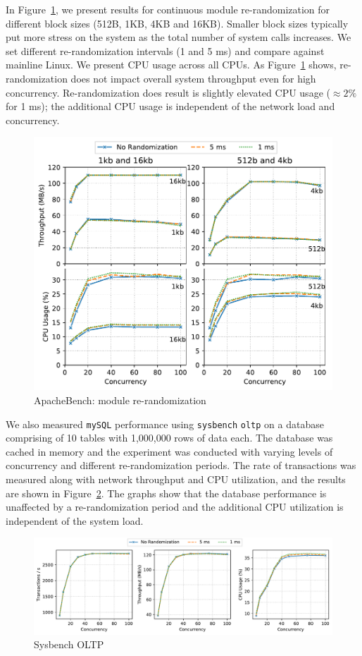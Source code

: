 In Figure~\ref{fig:network}, we present results for continuous module re-randomization for different block sizes (512B, 1KB, 4KB and 16KB). Smaller block sizes typically put more stress on the system as the total number of system calls increases. We set different re-randomization intervals (1 and 5 ms) and compare against mainline Linux. We present CPU usage across all CPUs.
As Figure~\ref{fig:network} shows, re-randomization does not impact overall system throughput even for high concurrency. Re-randomization does result is slightly elevated CPU usage ($\approx 2 \%$ for 1 ms); the additional CPU usage is independent of the network load and concurrency.

\begin{figure}[ht!]
\centering
\includegraphics[width=0.8\columnwidth]{charts/apache.pdf}
\caption{ApacheBench: module re-randomization}
\label{fig:network}
\end{figure}

We also measured \verb|mySQL| performance using \verb|sysbench| \verb|oltp| on a database comprising of 10 tables with 1,000,000 rows of data each. The database was cached in memory and the experiment was conducted with varying levels of concurrency and different re-randomization periods. The rate of transactions was measured along with network throughput and CPU utilization, and the results are shown in Figure~\ref{fig:sysbench_sql}. The graphs show that the database performance is unaffected by a re-randomization period and the additional CPU utilization is independent of the system load.

\begin{figure}[ht!]
\centering
\includegraphics[width=\columnwidth]{charts/sysbench_sql.pdf}
\caption{Sysbench OLTP}
\label{fig:sysbench_sql}
\end{figure}


